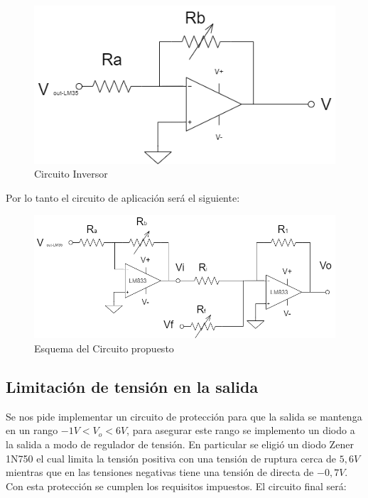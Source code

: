\begin{figure}[H]
    \centering
    \includegraphics[scale=0.5]{../Ejercicio4-CircuitodeAplicacion/CircInversor.png}
    \caption{Circuito Inversor}
\end{figure}

Por lo tanto el circuito de aplicación será el siguiente:

\begin{figure}[H]
    \centering
    \includegraphics[scale=0.5]{../Ejercicio4-CircuitodeAplicacion/CircAplicacion.png}
    \caption{Esquema del Circuito propuesto}
\end{figure}


\subsection{Limitación de tensión en la salida}

Se nos pide implementar un circuito de protección para que la salida se mantenga en un rango $-1V < V_o < 6V$, para asegurar este rango se implemento un diodo a la salida a modo de regulador de tensión. En particular se eligió un diodo Zener 1N750 el cual limita la tensión positiva con una tensión de ruptura cerca de $5,6V$ mientras que en las tensiones negativas tiene una tensión de directa de $-0,7V$. Con esta protección se cumplen los requisitos impuestos. El circuito final será:

